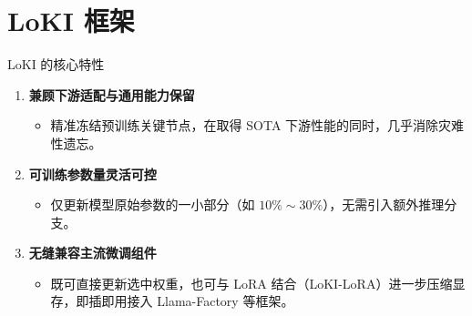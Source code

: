 \documentclass{beamer}
\begin{document}
    \section{LoKI 框架}
    \begin{frame}{LoKI 的核心特性}
        \begin{enumerate}\setlength{\itemsep}{0.6em}
            \item \textbf{兼顾下游适配与通用能力保留}
            \begin{itemize}
                \item 精准冻结预训练关键节点，在取得 SOTA 下游性能的同时，几乎消除灾难性遗忘。
            \end{itemize}
            
            \item \textbf{可训练参数量灵活可控}
            \begin{itemize}
                \item 仅更新模型原始参数的一小部分（如 $10\%\sim 30\%$），无需引入额外推理分支。
            \end{itemize}
            
            \item \textbf{无缝兼容主流微调组件}
            \begin{itemize}
                \item 既可直接更新选中权重，也可与 LoRA 结合（LoKI-LoRA）进一步压缩显存，即插即用接入 Llama-Factory 等框架。
            \end{itemize}
        \end{enumerate}
    \end{frame}
    
\end{document}

